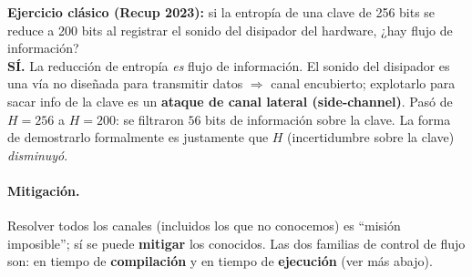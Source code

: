\documentclass[../main.tex]{subfiles}
\begin{document}
\begin{examen}
\textbf{Ejercicio clásico (Recup 2023):} si la entropía de una clave de 256 bits
se reduce a 200 bits al registrar el sonido del disipador del hardware,
¿hay flujo de información?\\
\textbf{SÍ.} La reducción de entropía \emph{es} flujo de información. El sonido del
disipador es una vía no diseñada para transmitir datos $\Rightarrow$ canal
encubierto; explotarlo para sacar info de la clave es un \textbf{ataque de canal
lateral (side-channel)}. Pasó de $H = 256$ a $H = 200$: se filtraron $56$ bits de
información sobre la clave. La forma de demostrarlo formalmente es justamente que
$H$ (incertidumbre sobre la clave) \emph{disminuyó}.
\end{examen}

\begin{center}
\end{center}

\paragraph{Mitigación.} Resolver todos los canales (incluidos los que no
conocemos) es ``misión imposible''; sí se puede \textbf{mitigar} los conocidos.
Las dos familias de control de flujo son: en tiempo de \textbf{compilación} y en
tiempo de \textbf{ejecución} (ver más abajo).
\end{document}
